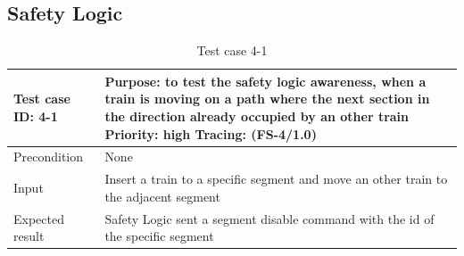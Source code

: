 \subsection{Safety Logic}

\begin{table}[H]
	\caption{Test case 4-1}
	\label{table:TCase-FS4-1}
	\begin{center}
		\renewcommand{\arraystretch}{1.8}
		\begin{tabu} 
			to 0.9 \textwidth
			{  X[0.3, l] X[l] }
			\toprule
			Test case ID: 4-1 & Purpose: to test the safety logic awareness, when a train is moving on a path where the next section in the direction already occupied by an other train \newline Priority: high \newline Tracing: (FS-4/1.0) \\ \midrule
			Precondition      & None                                                                                                                                                                                                          \\
			Input             & Insert a train to a specific segment and move an other train to the adjacent segment                                                                                                                          \\
			Expected result   & Safety Logic sent a segment disable command with the id of the specific segment                                                                                                                               \\ \bottomrule
		\end{tabu}
	\end{center}
\end{table} 


